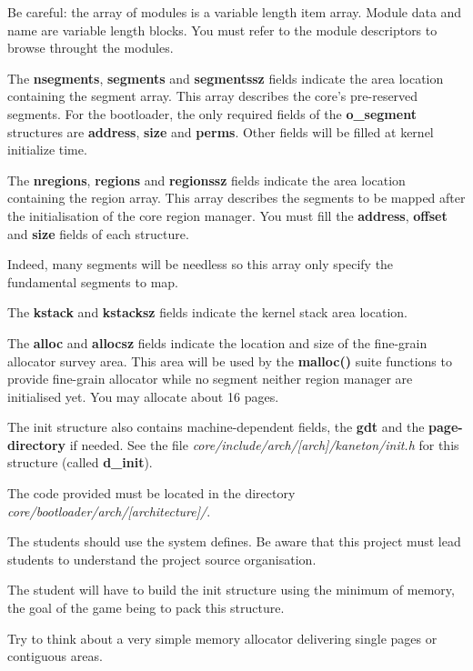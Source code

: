 Be  careful:  the   array  of  modules  is  a   variable  length  item
array. Module data and name are variable length blocks. You must refer
to the module descriptors to browse throught the modules.

The  \textbf{nsegments},   \textbf{segments}  and  \textbf{segmentssz}
fields indicate  the area location containing the  segment array. This
array describes the core's  pre-reserved segments. For the bootloader,
the  only required  fields of  the \textbf{o\_segment}  structures are
\textbf{address}, \textbf{size} and  \textbf{perms}. Other fields will
be filled at kernel initialize time.

The \textbf{nregions},  \textbf{regions} and \textbf{regionssz} fields
indicate  the area location  containing the  region array.  This array
describes the  segments to be  mapped after the initialisation  of the
core   region   manager.   You   must   fill   the   \textbf{address},
\textbf{offset} and \textbf{size} fields of each structure.

Indeed, many segments will be needless so this array only specify the
fundamental segments to map.

The \textbf{kstack} and \textbf{kstacksz} fields indicate the kernel
stack area location.

The \textbf{alloc}  and \textbf{allocsz} fields  indicate the location
and size  of the fine-grain allocator  survey area. This  area will be
used by  the \textbf{malloc()}  suite functions to  provide fine-grain
allocator  while no  segment  neither region  manager are  initialised
yet. You may allocate about 16 pages.

The  init  structure   also  contains  machine-dependent  fields,  the
\textbf{gdt} and the \textbf{page-directory}  if needed.  See the file
\textit{core/include/arch/[arch]/kaneton/init.h}  for  this  structure
(called \textbf{d\_init}).

The code provided must be located in the directory
\textit{core/bootloader/arch/[architecture]/}.

The students should use the system defines. Be aware that this project
must lead students to understand the project source organisation.

The student will have to build the init structure using the minimum
of memory, the goal of the game being to pack this structure.

Try to  think about a  very simple memory allocator  delivering single
pages or contiguous areas.

